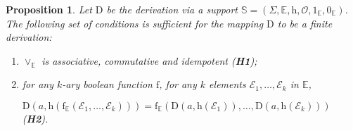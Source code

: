 \documentclass{article}
\newtheorem{proposition}{Proposition}
\begin{document}
    \begin{proposition}\label{prop finitude}
    Let $\mathrm{D}$ be the derivation via a support $\mathbb{S}=(\Sigma,\mathbb{E},\mathrm{h},\mathcal{O},1_\mathbb{E},0_\mathbb{E})$. The following set of conditions is sufficient for the mapping $\mathrm{D}$ to be a finite derivation:
    
      \begin{enumerate}
        \item $\vee_{\mathbb{E}}$ is associative, commutative and idempotent (\textbf{H1});
        \item for any $k$-ary boolean function $\mathrm{f}$, for any $k$ elements $\mathcal{E}_1,\ldots,\mathcal{E}_k$ in $\mathbb{E}$,
        
        \centerline{
          $\mathrm{D}(a,\mathrm{h}(\mathrm{f}_{\mathbb{E}}(\mathcal{E}_1,\ldots,\mathcal{E}_k)))=\mathrm{f}_{\mathbb{E}}(\mathrm{D}(a,\mathrm{h}(\mathcal{E}_1)),\ldots,\mathrm{D}(a,\mathrm{h}(\mathcal{E}_k)))$ (\textbf{H2}).
        }
      \end{enumerate}
      
  \end{proposition}
\end{document}
